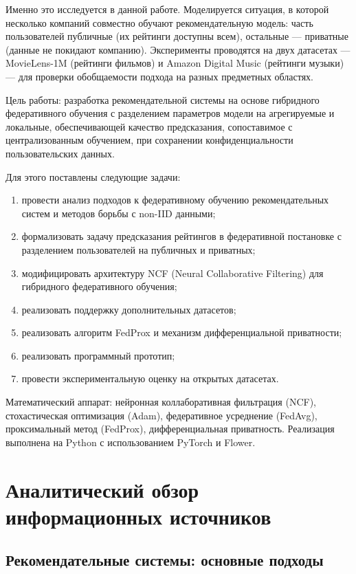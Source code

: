 \documentclass[14pt,a4paper]{extarticle}
\begin{document}
Именно это исследуется в данной работе. Моделируется ситуация, в которой несколько компаний совместно обучают рекомендательную модель: часть пользователей публичные (их рейтинги доступны всем), остальные --- приватные (данные не покидают компанию). Эксперименты проводятся на двух датасетах --- MovieLens-1M (рейтинги фильмов) и Amazon Digital Music (рейтинги музыки) --- для проверки обобщаемости подхода на разных предметных областях.

Цель работы: разработка рекомендательной системы на основе гибридного федеративного обучения с разделением параметров модели на агрегируемые и локальные, обеспечивающей качество предсказания, сопоставимое с централизованным обучением, при сохранении конфиденциальности пользовательских данных.

Для этого поставлены следующие задачи:
\begin{enumerate}
  \item провести анализ подходов к федеративному обучению рекомендательных систем и методов борьбы с non-IID данными;
  \item формализовать задачу предсказания рейтингов в федеративной постановке с разделением пользователей на публичных и приватных;
  \item модифицировать архитектуру NCF (Neural Collaborative Filtering) для гибридного федеративного обучения;
  \item реализовать поддержку дополнительных датасетов;
  \item реализовать алгоритм FedProx и механизм дифференциальной приватности;
  \item реализовать программный прототип;
  \item провести экспериментальную оценку на открытых датасетах.
\end{enumerate}

Математический аппарат: нейронная коллаборативная фильтрация (NCF), стохастическая оптимизация (Adam), федеративное усреднение (FedAvg), проксимальный метод (FedProx), дифференциальная приватность. Реализация выполнена на Python с использованием PyTorch и Flower.

\newpage


\section{Аналитический обзор информационных источников}

\subsection{Рекомендательные системы: основные подходы}
\end{document}
